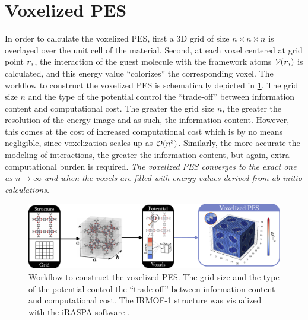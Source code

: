 \section{Voxelized PES}
\label{sec:voxelized_pes}

In order to calculate the voxelized PES, first a 3D grid of size $n\times
n\times n$ is overlayed over the unit cell of the material. Second, at each
voxel centered at grid point $\boldsymbol{r}_i$, the interaction of the guest molecule
with the framework atoms $\mathcal{V}(\boldsymbol{r}_i)$ is calculated, and this energy
value ``colorizes'' the corresponding voxel. The workflow to construct the
voxelized PES is schematically depicted in \Figure{} \ref{fig:voxelized_pes}. The
grid size $n$ and the type of the potential control the ``trade-off'' between
information content and computational
cost. The greater the grid size $n$, the greater the
resolution of the energy image and as such, the information content. However,
this comes at the cost of increased computational cost which is by no means
negligible, since voxelization scales up as $\mathcal{O}(n^3)$.
Similarly, the more accurate the modeling of interactions, the greater the
information content, but again, extra computational burden is required.
\emph{The voxelized PES converges to the exact one as $n \to \infty$ and when
the voxels are filled with energy values derived from ab-initio
calculations.}

\begin{figure}
	\centering
	\includegraphics[width=\textwidth]{fig/voxelized_pes.pdf}
	\caption[Workflow to construct the voxelized PES.]{Workflow to construct the
	voxelized PES. The grid size and the type of the potential control the
	``trade-off'' between information content and computational cost. The
	IRMOF-1 structure was visualized with the iRASPA software
	\parencite{Dubbeldam2018}.}
	\label{fig:voxelized_pes}
\end{figure}

